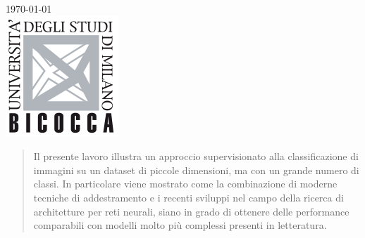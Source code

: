 \begin{titlepage}
{\large \today}\\[2cm] %


\hspace*{0.4cm}\includegraphics[scale=0.75]{logo.png}\\[1cm] %
 

\vfill %

\end{titlepage}


\begin{abstract}
Il presente lavoro illustra un approccio supervisionato alla classificazione di immagini su un dataset di piccole dimensioni, ma con un grande numero di classi. In particolare viene mostrato come la combinazione di moderne tecniche di addestramento e i recenti sviluppi nel campo della ricerca di architetture per reti neurali, siano in grado di ottenere delle performance comparabili con modelli molto più complessi presenti in letteratura.
\cite{Nowell23}
\end{abstract}

